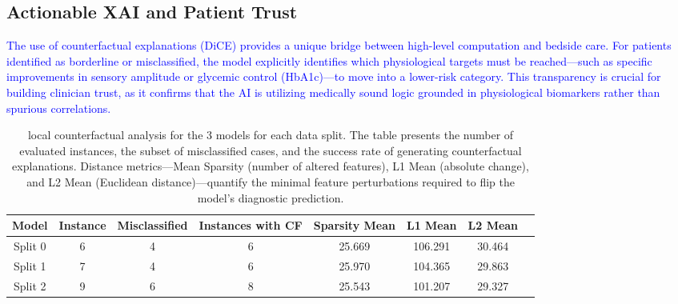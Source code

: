 \documentclass[fleqn,10pt]{wlscirep}
\begin{document}
\subsection*{Actionable XAI and Patient Trust}
\textcolor{blue}{The use of counterfactual explanations (DiCE) provides a unique bridge between high-level computation and bedside care. For patients identified as borderline or misclassified, the model explicitly identifies which physiological targets must be reached—such as specific improvements in sensory amplitude or glycemic control (HbA1c)—to move into a lower-risk category. This transparency is crucial for building clinician trust, as it confirms that the AI is utilizing medically sound logic grounded in physiological biomarkers rather than spurious correlations.}

\begin{table}[h]
\centering
\small
\begin{tabular}{cccccccc}
\toprule
Model & Instance  & Misclassified & Instances with CF & Sparsity Mean & L1 Mean & L2 Mean \\
\midrule
Split 0 & 6 & 4 & 6 & 25.669 & 106.291 & 30.464 \\
Split 1 & 7 & 4 & 6 & 25.970 & 104.365 & 29.863 \\
Split 2 & 9 & 6 & 8 & 25.543 & 101.207 & 29.327 \\
\bottomrule
\end{tabular}
\caption{local counterfactual analysis for the 3 models for each data split. The table presents the number of evaluated instances, the subset of misclassified cases, and the success rate of generating counterfactual explanations. Distance metrics—Mean Sparsity (number of altered features), L1 Mean (absolute change), and L2 Mean (Euclidean distance)—quantify the minimal feature perturbations required to flip the model's diagnostic prediction. 
}
\label{tab:localcf-summary-all}
\end{table}
\end{document}
